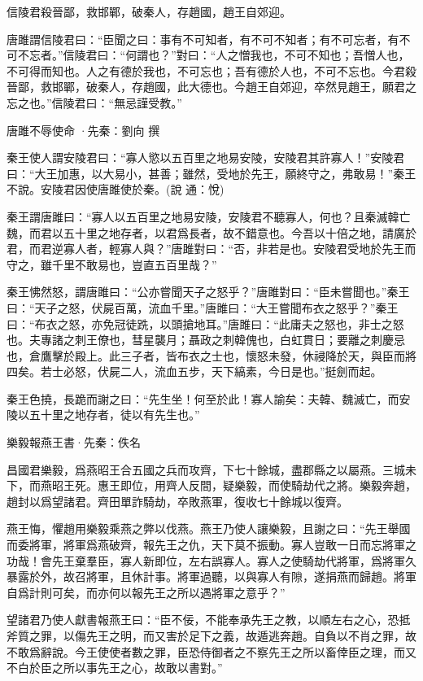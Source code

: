 \documentclass[12pt,a4paper]{ctexbook}
\begin{document}
信陵君殺晉鄙，救邯鄲，破秦人，存趙國，趙王自郊迎。\par
唐雎謂信陵君曰：“臣聞之曰：事有不可知者，有不可不知者；有不可忘者，有不可不忘者。”信陵君曰：“何謂也？”對曰：“人之憎我也，不可不知也；吾憎人也，不可得而知也。人之有德於我也，不可忘也；吾有德於人也，不可不忘也。今君殺晉鄙，救邯鄲，破秦人，存趙國，此大德也。今趙王自郊迎，卒然見趙王，願君之忘之也。”信陵君曰：“無忌謹受教。”\par
唐雎不辱使命 ·先秦：劉向 撰 \par
秦王使人謂安陵君曰：“寡人慾以五百里之地易安陵，安陵君其許寡人！”安陵君曰：“大王加惠，以大易小，甚善；雖然，受地於先王，願終守之，弗敢易！”秦王不說。安陵君因使唐雎使於秦。(說 通：悅)\par
秦王謂唐雎曰：“寡人以五百里之地易安陵，安陵君不聽寡人，何也？且秦滅韓亡魏，而君以五十里之地存者，以君爲長者，故不錯意也。今吾以十倍之地，請廣於君，而君逆寡人者，輕寡人與？”唐雎對曰：“否，非若是也。安陵君受地於先王而守之，雖千里不敢易也，豈直五百里哉？”\par
秦王怫然怒，謂唐雎曰：“公亦嘗聞天子之怒乎？”唐雎對曰：“臣未嘗聞也。”秦王曰：“天子之怒，伏屍百萬，流血千里。”唐雎曰：“大王嘗聞布衣之怒乎？”秦王曰：“布衣之怒，亦免冠徒跣，以頭搶地耳。”唐雎曰：“此庸夫之怒也，非士之怒也。夫專諸之刺王僚也，彗星襲月；聶政之刺韓傀也，白虹貫日；要離之刺慶忌也，倉鷹擊於殿上。此三子者，皆布衣之士也，懷怒未發，休祲降於天，與臣而將四矣。若士必怒，伏屍二人，流血五步，天下縞素，今日是也。”挺劍而起。\par
秦王色撓，長跪而謝之曰：“先生坐！何至於此！寡人諭矣：夫韓、魏滅亡，而安陵以五十里之地存者，徒以有先生也。”\par
樂毅報燕王書·先秦：佚名 \par
昌國君樂毅，爲燕昭王合五國之兵而攻齊，下七十餘城，盡郡縣之以屬燕。三城未下，而燕昭王死。惠王即位，用齊人反間，疑樂毅，而使騎劫代之將。樂毅奔趙，趙封以爲望諸君。齊田單詐騎劫，卒敗燕軍，復收七十餘城以復齊。\par
燕王悔，懼趙用樂毅乘燕之弊以伐燕。燕王乃使人讓樂毅，且謝之曰：“先王舉國而委將軍，將軍爲燕破齊，報先王之仇，天下莫不振動。寡人豈敢一日而忘將軍之功哉！會先王棄羣臣，寡人新即位，左右誤寡人。寡人之使騎劫代將軍，爲將軍久暴露於外，故召將軍，且休計事。將軍過聽，以與寡人有隙，遂捐燕而歸趙。將軍自爲計則可矣，而亦何以報先王之所以遇將軍之意乎？”\par
望諸君乃使人獻書報燕王曰：“臣不佞，不能奉承先王之教，以順左右之心，恐抵斧質之罪，以傷先王之明，而又害於足下之義，故遁逃奔趙。自負以不肖之罪，故不敢爲辭說。今王使使者數之罪，臣恐侍御者之不察先王之所以畜倖臣之理，而又不白於臣之所以事先王之心，故敢以書對。”\par
\end{document}
